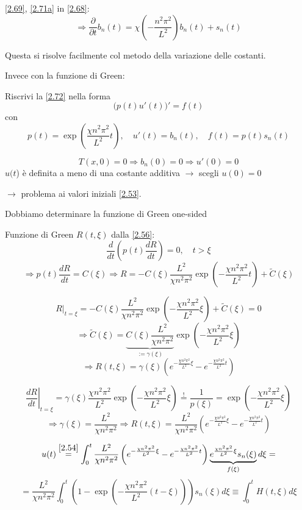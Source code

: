 \documentclass[a4paper,11pt]{report}
\begin{document}
\eqref{2.69}, \eqref{2.71a} in \eqref{2.68}:
\begin{equation}
\Rightarrow \frac{\partial}{\partial t} b_n(t)=\chi \left(-\frac{n^2 \pi^2}{L^2}\right)b_n(t) + s_n(t)
\label{2.72}
\end{equation}

Questa si risolve facilmente col metodo della variazione delle costanti.

Invece con la funzione di Green: 

Riscrivi la \eqref{2.72} nella forma 
\[
\big(p(t)u'(t)\big)'=f(t)
\]
con
\[
p(t)=\exp\left(\frac{\chi n^2 \pi^2}{L^2}t\right), \quad u'(t)=b_n(t),\quad f(t)=p(t)s_n(t)
\]

\[
T(x,0)=0 \Rightarrow b_n(0)=0 \Rightarrow u'(0)=0
\]
$u(t$) \`e definita a meno di una costante additiva $\rightarrow$ scegli $u(0)=0$ 

$\rightarrow$ problema ai valori iniziali \eqref{2.53}.

Dobbiamo determinare la funzione di Green one-sided

Funzione di Green $R(t,\xi)$ dalla \eqref{2.56}:
\[
\frac{d}{dt}\left(p(t)\frac{dR}{dt}\right)=0, \quad t>\xi
\]
\[
\Rightarrow p(t)\frac{dR}{dt}=C(\xi) \Rightarrow R=-C(\xi)\frac{L^2}{\chi n^2\pi^2} \exp \left(-\frac{\chi n^2 \pi^2}{L^2}t\right)+\tilde{C}(\xi)
\]

\[
R\big|_{t=\xi}=-C(\xi)\frac{L^2}{\chi n^2\pi^2} \exp \left(-\frac{\chi n^2 \pi^2}{L^2}\xi \right)+\tilde{C}(\xi) =0
\]
\[
\Rightarrow \tilde{C}(\xi)=\underbrace{C(\xi) \frac{L^2}{\chi n^2 \pi^2}}_{:=\gamma(\xi)} \exp \left(-\frac{\chi n^2 \pi^2}{L^2}\xi \right)
\]
\[
\Rightarrow R(t,\xi)=\gamma(\xi)\left( e^{-\frac{\chi n^2 \pi^2}{L^2}\xi } - e^{-\frac{\chi n^2 \pi^2}{L^2}t }\right)
\]

\[
\left.\frac{dR}{dt}\right|_{t=\xi}=\gamma(\xi) \frac{\chi n^2 \pi^2}{L^2}\exp\left(-\frac{\chi n^2 \pi^2}{L^2}\xi \right)\overset{!}{=}\frac{1}{p(\xi)}=\exp\left(-\frac{\chi n^2 \pi^2}{L^2}\xi \right)
\]
\[
\Rightarrow \gamma(\xi)=\frac{L^2}{\chi n^2 \pi^2} \Rightarrow R(t,\xi)=\frac{L^2}{\chi n^2 \pi^2} \left( e^{-\frac{\chi n^2 \pi^2}{L^2}\xi } - e^{-\frac{\chi n^2 \pi^2}{L^2}t }\right)
\]

\[
u(t)\overset{\eqref{2.54}}{=}\int_0^t \frac{L^2}{\chi n^2 \pi^2}\left(e^{-\frac{\chi n^2 \pi^2}{L^2}\xi } - e^{-\frac{\chi n^2 \pi^2}{L^2}t }\right) \underbrace{e^{\frac{\chi n^2 \pi^2}{L^2}\xi} s_n(\xi)}_{f(\xi)} d\xi=
\]
\[
=\frac{L^2}{\chi n^2 \pi^2}\int_0^t\left( 1-\exp\left( -\frac{\chi n^2 \pi^2}{L^2}(t-\xi)\right)\right) s_n(\xi)d\xi \equiv \int_0^t H(t,\xi)d\xi
\]
\end{document}
